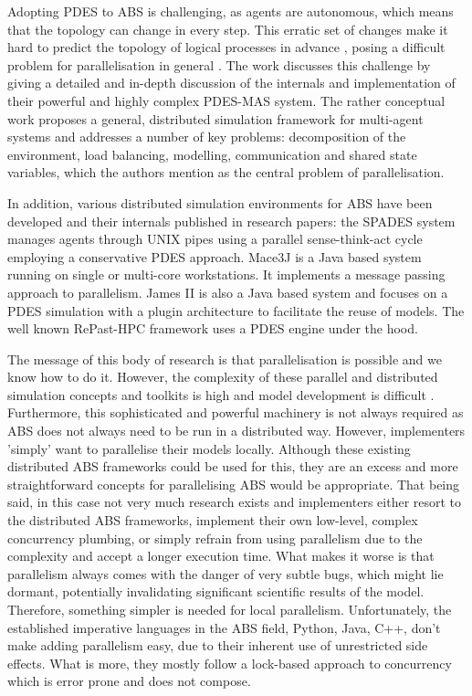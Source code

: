 Adopting PDES to ABS is challenging, as agents are autonomous, which means that the topology can change in every step. This erratic set of changes make it hard to predict the topology of logical processes in advance \cite{lees_using_2008}, posing a difficult problem for parallelisation in general \cite{cicirelli_efficient_2015}. The work \cite{suryanarayanan_synchronised_2013, suryanarayanan_pdes-mas_2013} discusses this challenge by giving a detailed and in-depth discussion of the internals and implementation of their powerful and highly complex PDES-MAS system. The rather conceptual work \cite{logan_distributed_2001} proposes a general, distributed simulation framework for multi-agent systems and addresses a number of key problems: decomposition of the environment, load balancing, modelling, communication and shared state variables, which the authors mention as the central problem of parallelisation.

In addition, various distributed simulation environments for ABS have been developed and their internals published in research papers: the SPADES system \cite{riley_next_2003} manages agents through UNIX pipes using a parallel sense-think-act cycle employing a conservative PDES approach. Mace3J \cite{gasser_mace3j:_2002} is a Java based system running on single or multi-core workstations. It implements a message passing approach to parallelism. James II \cite{himmelspach_plugn_2007} is also a Java based system and focuses on a PDES simulation with a plugin architecture to facilitate the reuse of models. The well known RePast-HPC \cite{gorur_repast_2016, minson_distributing_2008} framework uses a PDES engine under the hood. 

The message of this body of research is that parallelisation is possible and we know how to do it. However, the complexity of these parallel and distributed simulation concepts and toolkits is high and model development is difficult \cite{abar_agent_2017}. Furthermore, this sophisticated and powerful machinery is not always required as ABS does not always need to be run in a distributed way. However, implementers 'simply' want to parallelise their models locally. Although these existing distributed ABS frameworks could be used for this, they are an excess and more straightforward concepts for parallelising ABS would be appropriate. That being said, in this case not very much research exists and implementers either resort to the distributed ABS frameworks, implement their own low-level, complex concurrency plumbing, or simply refrain from using parallelism due to the complexity and accept a longer execution time. What makes it worse is that parallelism always comes with the danger of very subtle bugs, which might lie dormant, potentially invalidating significant scientific results of the model. Therefore, something simpler is needed for local parallelism. Unfortunately, the established imperative languages in the ABS field, Python, Java, C++, don't make adding parallelism easy, due to their inherent use of unrestricted side effects. What is more, they mostly follow a lock-based approach to concurrency which is error prone and does not compose.

